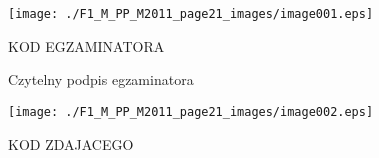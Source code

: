 \documentclass[a4paper,12pt]{article}
\begin{document}
\begin{center}
\texttt{[image: ./F1\_M\_PP\_M2011\_page21\_images/image001.eps]}
\end{center}
KOD EGZAMINATORA

Czytelny podpis egzaminatora
\begin{center}
\texttt{[image: ./F1\_M\_PP\_M2011\_page21\_images/image002.eps]}
\end{center}
KOD ZDAJACEGO
\end{document}
